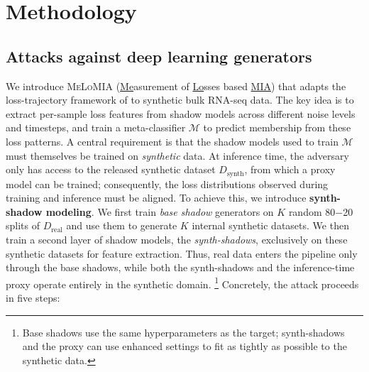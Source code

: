 \documentclass[11pt]{article}
\begin{document}
\section{Methodology}\label{sec:methods}

\subsection{Attacks against deep learning generators} %
We introduce \textsc{MeLoMIA} (\ul{Me}asurement of \ul{Lo}sses based \ul{MIA}) that adapts the loss-trajectory framework of \cite{wu2025winning} to synthetic bulk RNA-seq data. The key idea is to extract per-sample loss features from shadow models across different noise levels and timesteps, and train a meta-classifier $\mathcal{M}$ to predict membership from these loss patterns.
%
A central requirement is that the shadow models used to train $\mathcal{M}$ must themselves be trained on \emph{synthetic} data. At inference time, the adversary only has access to the released synthetic dataset $D_{\text{synth}}$, from which a proxy model can be trained; consequently, the loss distributions observed during training and inference must be aligned. To achieve this, we introduce \textbf{synth-shadow modeling}. We first train \emph{base shadow} generators on $K$ random 80$-$20 splits of $D_{\text{real}}$ and use them to generate $K$ internal synthetic datasets. We then train a second layer of shadow models, the \emph{synth-shadows}, exclusively on these synthetic datasets for feature extraction. Thus, real data enters the pipeline only through the base shadows, while both the synth-shadows and the inference-time proxy operate entirely in the synthetic domain. \footnote{Base shadows use the same hyperparameters as the target; synth-shadows and the proxy can use enhanced settings to fit as tightly as possible to the synthetic data.}
%
Concretely, the attack proceeds in five steps:
\end{document}
